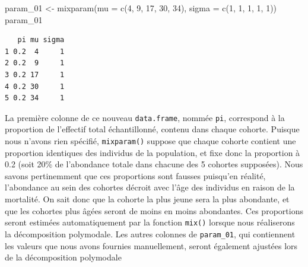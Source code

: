 \documentclass[
  a4paper,
  DIV=11,
  numbers=noendperiod,
  oneside]{scrreprt}
\newenvironment{Shaded}{}{}
\newcommand{\AttributeTok}[1]{\textcolor[rgb]{0.84,0.23,0.29}{#1}}
\newcommand{\DecValTok}[1]{\textcolor[rgb]{0.00,0.36,0.77}{#1}}
\newcommand{\FunctionTok}[1]{\textcolor[rgb]{0.44,0.26,0.76}{#1}}
\newcommand{\NormalTok}[1]{\textcolor[rgb]{0.14,0.16,0.18}{#1}}
\newcommand{\OtherTok}[1]{\textcolor[rgb]{0.44,0.26,0.76}{#1}}
\begin{document}
\begin{Shaded}
\begin{Highlighting}[]
\NormalTok{param\_01 }\OtherTok{\textless{}{-}} \FunctionTok{mixparam}\NormalTok{(}\AttributeTok{mu =} \FunctionTok{c}\NormalTok{(}\DecValTok{4}\NormalTok{, }\DecValTok{9}\NormalTok{, }\DecValTok{17}\NormalTok{, }\DecValTok{30}\NormalTok{, }\DecValTok{34}\NormalTok{),}
                     \AttributeTok{sigma =} \FunctionTok{c}\NormalTok{(}\DecValTok{1}\NormalTok{, }\DecValTok{1}\NormalTok{, }\DecValTok{1}\NormalTok{, }\DecValTok{1}\NormalTok{, }\DecValTok{1}\NormalTok{))}
\NormalTok{param\_01}
\end{Highlighting}
\end{Shaded}

\begin{verbatim}
   pi mu sigma
1 0.2  4     1
2 0.2  9     1
3 0.2 17     1
4 0.2 30     1
5 0.2 34     1
\end{verbatim}


La première colonne de ce nouveau \texttt{data.frame}, nommée
\texttt{pi}, correspond à la proportion de l'effectif total
échantillonné, contenu dans chaque cohorte. Puisque nous n'avons rien
spécifié, \texttt{mixparam()} suppose que chaque cohorte contient une
proportion identiques des individus de la population, et fixe donc la
proportion à 0.2 (soit 20\% de l'abondance totale dans chacune des 5
cohortes supposées). Nous savons pertinemment que ces proportions sont
fausses puisqu'en réalité, l'abondance au sein des cohortes décroit avec
l'âge des individus en raison de la mortalité. On sait donc que la
cohorte la plus jeune sera la plus abondante, et que les cohortes plus
âgées seront de moins en moins abondantes. Ces proportions seront
estimées automatiquement par la fonction \texttt{mix()} lorsque nous
réaliserons la décomposition polymodale. Les autres colonnes de
\texttt{param\_01}, qui contiennent les valeurs que nous avons fournies
manuellement, seront également ajustées lors de la décomposition
polymodale
\end{document}
